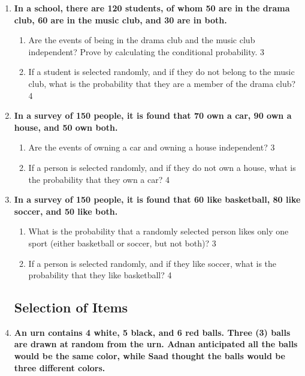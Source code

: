 \documentclass[a4paper,oneside, margin=1.4in]{book}
\begin{document}
\begin{enumerate}
  \item  
  \textbf{In a school, there are 120 students, of whom 50 are in the drama club, 60 are in the music club, and 30 are in both.}  

  \begin{enumerate}  
    \item  
    	Are the events of being in the drama club and the music club independent? Prove by calculating the conditional probability. \hfill 3  
    \item  
    	If a student is selected randomly, and if they do not belong to the music club, what is the probability that they are a member of the drama club? \hfill 4  
  \end{enumerate}  

\item  
  \textbf{In a survey of 150 people, it is found that 70 own a car, 90 own a house, and 50 own both.}  

  \begin{enumerate}  
    \item  
    	Are the events of owning a car and owning a house independent?  \hfill 3  
    \item  
    	If a person is selected randomly, and if they do not own a house, what is the probability that they own a car? \hfill 4  
  \end{enumerate}  
  
  \item  
  \textbf{In a survey of 150 people, it is found that 60 like basketball, 80 like soccer, and 50 like both.}  

  \begin{enumerate}  
    \item  
    	What is the probability that a randomly selected person likes only one sport (either basketball or soccer, but not both)? \hfill 3  
    \item  
    	If a person is selected randomly, and if they like soccer, what is the probability that they like basketball? \hfill 4  
  \end{enumerate}  


\subsection{Selection of Items}

 \item
	  \textbf{An urn contains 4 white, 5 black, and 6 red balls. Three (3) balls are drawn at random from the urn. Adnan anticipated all the balls would be the same color, while Saad thought the balls would be three different colors.} 
  

\end{enumerate}
\end{document}
